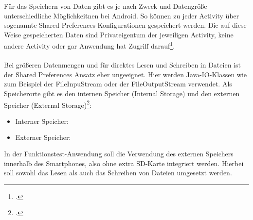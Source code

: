 Für das Speichern von Daten gibt es je nach Zweck und Datengröße unterschiedliche Möglichkeitnen bei Android. So können zu jeder Activity über sogenannte Shared Preferences Konfigurationen gespeichert werden. Die auf diese Weise gespeicherten Daten sind Privateigentum der jeweiligen Activity, keine andere Activity oder gar Anwendung hat Zugriff darauf\footcite{Android5}. 
\\
\\
Bei größeren Datenmengen und für direktes Lesen und Schreiben in Dateien ist der Shared Preferences Ansatz eher ungeeignet. Hier werden Java-IO-Klassen wie zum Beispiel der FileInpuStream oder der FileOutputStream verwendet. Als Speicherorte gibt es den internen Speicher (Internal Storage) und den externen Speicher (External Storage)\footcite{Android5}:

\begin{itemize}
\item Interner Speicher:
\item Externer Speicher:
\end{itemize}

In der Funktionstest-Anwendung soll die Verwendung des externen Speichers innerhalb des Smartphones, also ohne extra SD-Karte integriert werden. Hierbei soll sowohl das Lesen als auch das Schreiben von Dateien umgesetzt werden. 